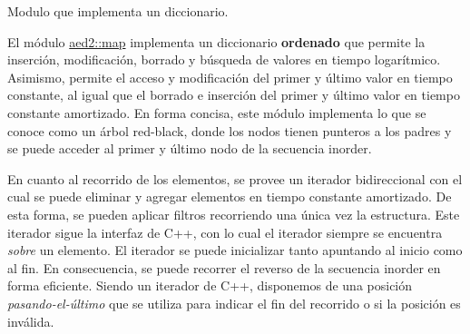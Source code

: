\-Modulo que implementa un diccionario. 

\-El módulo \hyperlink{classaed2_1_1map}{aed2\-::map} implementa un diccionario {\bfseries ordenado} que permite la inserción, modificación, borrado y búsqueda de valores en tiempo logarítmico. \-Asimismo, permite el acceso y modificación del primer y último valor en tiempo constante, al igual que el borrado e inserción del primer y último valor en tiempo constante amortizado. \-En forma concisa, este módulo implementa lo que se conoce como un árbol red-\/black, donde los nodos tienen punteros a los padres y se puede acceder al primer y último nodo de la secuencia inorder.

\-En cuanto al recorrido de los elementos, se provee un iterador bidireccional con el cual se puede eliminar y agregar elementos en tiempo constante amortizado. \-De esta forma, se pueden aplicar filtros recorriendo una única vez la estructura. \-Este iterador sigue la interfaz de \-C++, con lo cual el iterador siempre se encuentra {\itshape sobre\/} un elemento. \-El iterador se puede inicializar tanto apuntando al inicio como al fin. \-En consecuencia, se puede recorrer el reverso de la secuencia inorder en forma eficiente. \-Siendo un iterador de \-C++, disponemos de una posición {\itshape pasando-\/el-\/último\/} que se utiliza para indicar el fin del recorrido o si la posición es inválida.


